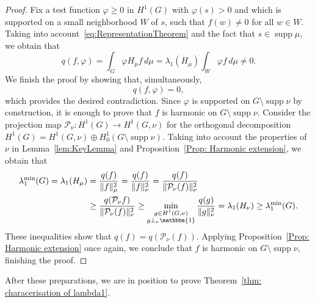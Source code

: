 \documentclass[reqno]{amsart}
\theoremstyle{plain}
\theoremstyle{definition}
\theoremstyle{remark}
\numberwithin{equation}{section}
\newcommand{\cP}{\mathcal{P}}   %
\newcommand{\one}{\mathbbm{1}}
\newcommand{\supp}{\operatorname{supp}}
\begin{document}
\begin{proof}
	Fix a test function $\varphi \ge 0 $ in $H^1(G)$ with  $\varphi(s) > 0$ and which is supported on a small neighborhood $W$ of $s $, such that $f(w) \neq 0$ for all $w \in W$. Taking into account~\eqref{eq:RepresentationTheorem} and the fact that $s \in \supp\mu$, we obtain that
	\[
	q(f, \varphi) = \int_G  \varphi H_\mu f \, d\mu = \lambda_1(H_\mu) \int_W \varphi f \, d\mu \neq 0.
	\]
	We finish the proof by showing that,  simultaneously,
	\[
	q(f, \varphi) =0,
	\]
	which provides the desired contradiction. Since $\varphi$ is supported on $G \setminus \supp \nu$ by construction, it is enough to prove that $f$ is harmonic on $G  \setminus \supp \nu$. Consider the projection map $\cP_\nu \colon H^1(G) \to  H^1(G, \nu)$ for the orthogonal decomposition $H^1(G) = H^1(G, \nu) \oplus H^1_0(G \setminus \supp \nu)$. Taking into account the properties of $\nu$ in Lemma~\ref{lem:KeyLemma} and Proposition~\ref{Prop: Harmonic extension}, we obtain that
	\begin{align*}
		\lambda_1^{\min}(G) =
		\lambda_1 (H_\mu) & = \frac{q(f)}{\|f\|_\mu^2} = \frac{q(f)}{\|f\|_\nu^2} =  \frac{q(f)}{\| \cP_\nu(f)\|_\nu^2} \\
		& \ge  \frac{q(\cP_\nu f)}{\| \cP_\nu(f)\|_\nu^2} \ge \min_{\substack{g \in H^1(G, \nu)       \\ g\perp_\nu \one}} \frac{q(g)}{\| g \|_\nu^2} = \lambda_1(H_\nu)  \ge \lambda_1^{\min}(G).
	\end{align*}
	These inequalities show that  $q(f)  = q(\cP_\nu(f))$. Applying Proposition~\ref{Prop: Harmonic extension} once again, we conclude that $f$ is harmonic on $G \setminus \supp \nu$, finishing the proof.
	
\end{proof}


After these preparations, we are in position to prove Theorem~\ref{thm: characerisation of lambda1}.
\end{document}

